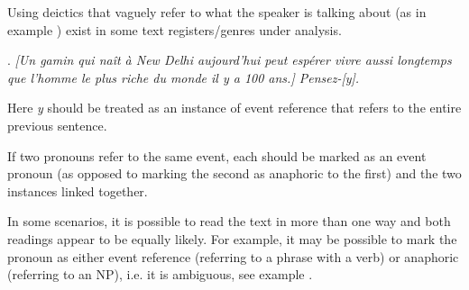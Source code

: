 \documentclass[a4paper]{article}
\begin{document}
{{Using deictics that vaguely refer to what the speaker is talking about (as in example \Next) exist in some text registers/genres under analysis. 

\ex.
\textsl{[Un gamin qui naît à New Delhi aujourd'hui peut espérer vivre aussi
longtemps que l'homme le plus riche du monde il y a 100 ans.] Pensez-[y].}

Here \textsl{y} should be treated as an instance of event reference that refers
to the entire previous sentence.


% 
% 
% 
If two pronouns refer to the same event, each should be marked as an event pronoun (as opposed to marking the second as anaphoric to the first) and the two instances linked together.

In some scenarios, it is possible to read the text in more than one way and both readings appear to be equally likely. For example, it may be possible to mark the pronoun as either event reference (referring to a phrase with a verb) or
anaphoric (referring to an NP), i.e. it is ambiguous, see example \Next.

}}
\end{document}
